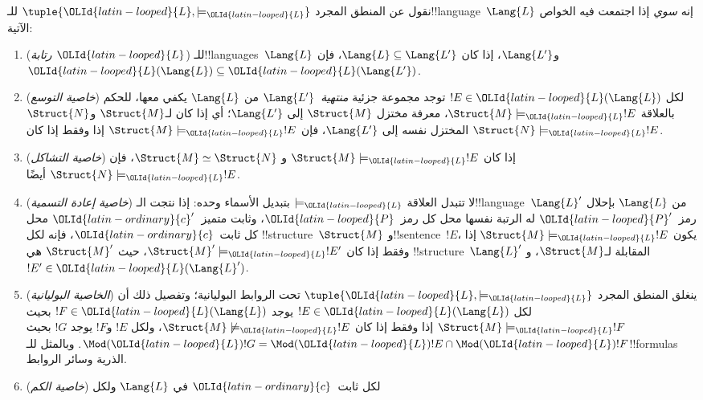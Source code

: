 \documentclass[../../../include/open-logic-section]{subfiles}
\begin{document}
\begin{defn}
نقول عن المنطق المجرد $\tuple{\OLId{latin-looped}{L},\models_\OLId{latin-looped}{L}}$ للـ!!{language}~$\Lang{L}$
إنه \emph{سوي} إذا اجتمعت فيه الخواص الآتية:
\begin{enumerate}
\item (\emph{رتابة $\OLId{latin-looped}{L}$}) للـ!!{language}s~$\Lang{L}$ و$\Lang{L'}$،
  إذا كان $\Lang{L} \subseteq \Lang{L'}$، فإن
  $\OLId{latin-looped}{L}(\Lang{L}) \subseteq \OLId{latin-looped}{L}(\Lang{L'})$.
\item (\emph{خاصية التوسع}) لكل $!E \in \OLId{latin-looped}{L}(\Lang{L})$ توجد مجموعة
  جزئية \emph{منتهية}~$\Lang{L'}$ من $\Lang{L}$ يكفي معها، للحكم بالعلاقة
  $\Struct{M} \models_\OLId{latin-looped}{L} !E$، معرفة مختزل $\Struct{M}$ إلى
  $\Lang{L'}$؛ أي إذا كان لـ$\Struct{M}$ و$\Struct{N}$ المختزل نفسه
  إلى $\Lang{L'}$، فإن $\Struct{M} \models_\OLId{latin-looped}{L} !E$ إذا وفقط إذا كان
  $\Struct{N} \models_\OLId{latin-looped}{L} !E$.
\item (\emph{خاصية التشاكل}) إذا كان $\Struct{M} \models_\OLId{latin-looped}{L} !E$ و
  $\Struct{M} \simeq \Struct{N}$، فإن $\Struct{N} \models_\OLId{latin-looped}{L} !E$ أيضًا.
\item (\emph{خاصية إعادة التسمية}) لا تتبدل العلاقة $\models_\OLId{latin-looped}{L}$ بتبديل
  الأسماء وحده: إذا نتجت الـ!!{language}~$\Lang{L}'$ من $\Lang{L}$ بإحلال
  رمز~$\OLId{latin-looped}{P}'$ له الرتبة نفسها محل كل رمز~$\OLId{latin-looped}{P}$، وثابت متميز~$\OLId{latin-ordinary}{c}'$ محل كل
  ثابت~$\OLId{latin-ordinary}{c}$، فإنه لكل !!{structure}~$\Struct{M}$ و!!{sentence}~$!E$،
  يكون $\Struct{M} \models_\OLId{latin-looped}{L} !E$ إذا وفقط إذا كان
  $\Struct{M}' \models_\OLId{latin-looped}{L} !E'$، حيث $\Struct{M}'$ هي
  !!{structure}~$\Lang{L}'$ المقابلة لـ$\Struct{M}$، و
  $!E' \in \OLId{latin-looped}{L}(\Lang{L}')$.
\item (\emph{الخاصية البوليانية}) ينغلق المنطق المجرد
  $\tuple{\OLId{latin-looped}{L},\models_\OLId{latin-looped}{L}}$ تحت الروابط البوليانية؛ وتفصيل ذلك أن لكل
  $!E \in \OLId{latin-looped}{L}(\Lang{L})$ يوجد $!F \in \OLId{latin-looped}{L}(\Lang{L})$ بحيث
  $\Struct{M} \models_\OLId{latin-looped}{L} !F$ إذا وفقط إذا كان
  $\Struct{M} \not\models_\OLId{latin-looped}{L} !E$، ولكل $!E$ و$!F$ يوجد $!G$ بحيث
  $\Mod(\OLId{latin-looped}{L}){!G}=\Mod(\OLId{latin-looped}{L}){!E} \cap \Mod(\OLId{latin-looped}{L}){!F}$. وبالمثل للـ!!{formula}s
  الذرية وسائر الروابط.
\item (\emph{خاصية الكم}) لكل ثابت~$\OLId{latin-ordinary}{c}$ في $\Lang{L}$ ولكل

\end{enumerate}
\end{defn}
\end{document}

